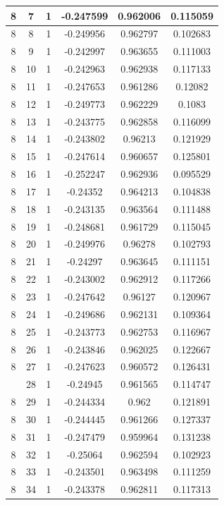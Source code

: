 \documentclass[12pt,a4paper]{article}
\numberwithin{equation}{section}
\numberwithin{figure}{section}
\numberwithin{table}{section}
\begin{document}
\begin{longtable}{|c|c|c|c|c|c|}
8 & 7 & 1 & -0.247599 & 0.962006 & 0.115059 \\ \hline
8 & 8 & 1 & -0.249956 & 0.962797 & 0.102683 \\ \hline
8 & 9 & 1 & -0.242997 & 0.963655 & 0.111003 \\ \hline
8 & 10 & 1 & -0.242963 & 0.962938 & 0.117133 \\ \hline
8 & 11 & 1 & -0.247653 & 0.961286 & 0.12082 \\ \hline
8 & 12 & 1 & -0.249773 & 0.962229 & 0.1083 \\ \hline
8 & 13 & 1 & -0.243775 & 0.962858 & 0.116099 \\ \hline
8 & 14 & 1 & -0.243802 & 0.96213 & 0.121929 \\ \hline
8 & 15 & 1 & -0.247614 & 0.960657 & 0.125801 \\ \hline
8 & 16 & 1 & -0.252247 & 0.962936 & 0.095529 \\ \hline
8 & 17 & 1 & -0.24352 & 0.964213 & 0.104838 \\ \hline
8 & 18 & 1 & -0.243135 & 0.963564 & 0.111488 \\ \hline
8 & 19 & 1 & -0.248681 & 0.961729 & 0.115045 \\ \hline
8 & 20 & 1 & -0.249976 & 0.96278 & 0.102793 \\ \hline
8 & 21 & 1 & -0.24297 & 0.963645 & 0.111151 \\ \hline
8 & 22 & 1 & -0.243002 & 0.962912 & 0.117266 \\ \hline
8 & 23 & 1 & -0.247642 & 0.96127 & 0.120967 \\ \hline
8 & 24 & 1 & -0.249686 & 0.962131 & 0.109364 \\ \hline
8 & 25 & 1 & -0.243773 & 0.962753 & 0.116967 \\ \hline
8 & 26 & 1 & -0.243846 & 0.962025 & 0.122667 \\ \hline
8 & 27 & 1 & -0.247623 & 0.960572 & 0.126431 \\ \hline
\pagebreak
8 & 28 & 1 & -0.24945 & 0.961565 & 0.114747 \\ \hline
8 & 29 & 1 & -0.244334 & 0.962 & 0.121891 \\ \hline
8 & 30 & 1 & -0.244445 & 0.961266 & 0.127337 \\ \hline
8 & 31 & 1 & -0.247479 & 0.959964 & 0.131238 \\ \hline
8 & 32 & 1 & -0.25064 & 0.962594 & 0.102923 \\ \hline
8 & 33 & 1 & -0.243501 & 0.963498 & 0.111259 \\ \hline
8 & 34 & 1 & -0.243378 & 0.962811 & 0.117313 \\ \hline

\end{longtable}
\end{document}
